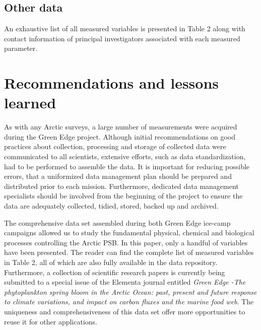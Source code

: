 \documentclass[essd, manuscript]{copernicus}
\begin{document}
\subsection{Other data}

An exhaustive list of all measured variables is presented in Table 2 along with contact information of principal investigators associated with each measured parameter.

\section{Recommendations and lessons learned}

As with any Arctic surveys, a large number of measurements were acquired during the Green Edge project. Although initial recommendations on good practices about collection, processing and storage of collected data were communicated to all scientists, extensive efforts, such as data standardization, had to be performed to assemble the data. It is important for reducing possible errors, that a uniformized data management plan should be prepared and distributed prior to each mission. Furthermore, dedicated data management specialists should be involved from the beginning of the project to ensure the data are adequately collected, tidied, stored, backed up and archived.

\conclusions  %

The comprehensive data set assembled during both Green Edge ice-camp campaigns allowed us to study the fundamental physical, chemical and biological processes controlling the Arctic PSB. In this paper, only a handful of variables have been presented. The reader can find the complete list of measured variables in Table 2, all of which are also fully available in the data repository. Furthermore, a collection of scientific research papers is currently being submitted to a special issue of the Elementa journal entitled \textit{Green Edge -The phytoplankton spring bloom in the Arctic Ocean: past, present and future response to climate variations, and impact on carbon fluxes and the marine food web}. The uniqueness and comprehensiveness of this data set offer more opportunities to reuse it for other applications.

\end{document}
